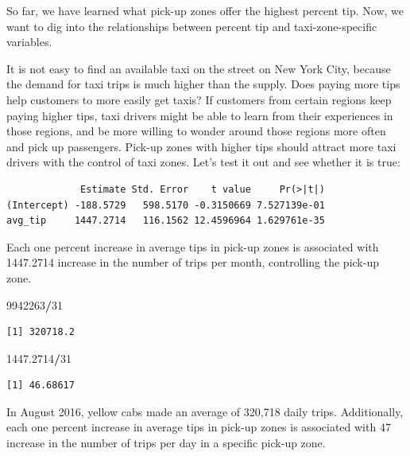 \documentclass[12pt,twoside]{reedthesis}
\newenvironment{Shaded}{\begin{snugshade}}{\end{snugshade}}
\newcommand{\KeywordTok}[1]{\textcolor[rgb]{0.13,0.29,0.53}{\textbf{#1}}}
\newcommand{\DataTypeTok}[1]{\textcolor[rgb]{0.13,0.29,0.53}{#1}}
\newcommand{\DecValTok}[1]{\textcolor[rgb]{0.00,0.00,0.81}{#1}}
\newcommand{\FloatTok}[1]{\textcolor[rgb]{0.00,0.00,0.81}{#1}}
\newcommand{\StringTok}[1]{\textcolor[rgb]{0.31,0.60,0.02}{#1}}
\newcommand{\CommentTok}[1]{\textcolor[rgb]{0.56,0.35,0.01}{\textit{#1}}}
\newcommand{\OperatorTok}[1]{\textcolor[rgb]{0.81,0.36,0.00}{\textbf{#1}}}
\newcommand{\NormalTok}[1]{#1}
\theoremstyle{definition}
\theoremstyle{definition}
\theoremstyle{definition}
\theoremstyle{remark}
\begin{document}
So far, we have learned what pick-up zones offer the highest percent
tip. Now, we want to dig into the relationships between percent tip and
taxi-zone-specific variables.

It is not easy to find an available taxi on the street on New York City,
because the demand for taxi trips is much higher than the supply. Does
paying more tips help customers to more easily get taxis? If customers
from certain regions keep paying higher tips, taxi drivers might be able
to learn from their experiences in those regions, and be more willing to
wonder around those regions more often and pick up passengers. Pick-up
zones with higher tips should attract more taxi drivers with the control
of taxi zones. Let's test it out and see whether it is true:
\begin{Shaded}
\end{Shaded}
\begin{verbatim}
             Estimate Std. Error    t value     Pr(>|t|)
(Intercept) -188.5729   598.5170 -0.3150669 7.527139e-01
avg_tip     1447.2714   116.1562 12.4596964 1.629761e-35
\end{verbatim}
Each one percent increase in average tips in pick-up zones is associated
with 1447.2714 increase in the number of trips per month, controlling
the pick-up zone.
\begin{Shaded}
\begin{Highlighting}[]
\DecValTok{9942263}\OperatorTok{/}\DecValTok{31}
\end{Highlighting}
\end{Shaded}
\begin{verbatim}
[1] 320718.2
\end{verbatim}
\begin{Shaded}
\begin{Highlighting}[]
\FloatTok{1447.2714}\OperatorTok{/}\DecValTok{31}
\end{Highlighting}
\end{Shaded}
\begin{verbatim}
[1] 46.68617
\end{verbatim}
In August 2016, yellow cabs made an average of 320,718 daily trips.
Additionally, each one percent increase in average tips in pick-up zones
is associated with 47 increase in the number of trips per day in a
specific pick-up zone.
\end{document}
